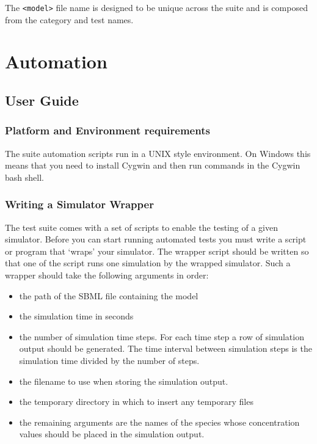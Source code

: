 \documentclass{cekarticle}
\begin{document}
The \texttt{<model>} file name is designed to be unique across the
suite and is composed from the category and test names.

\section{Automation}
\label{sec:automation}

\subsection{User Guide}
\label{sec:user-guide}

\subsubsection{Platform and Environment requirements}

The suite automation scripts run in a UNIX style environment. On
Windows this means that you need to install Cygwin and then run
commands in the Cygwin bash shell.

\subsubsection{Writing a Simulator Wrapper}

The test suite comes with a set of scripts to enable the testing
of a given simulator.  Before you can start running automated
tests you must write a script or program that `wraps' your
simulator.  The wrapper script should be written so that one of
the script runs one simulation by the wrapped simulator.  Such a
wrapper should take the following arguments in order:
\begin{itemize}

\item the path of the SBML file containing the model

\item the simulation time in seconds

\item the number of simulation time steps.  For each time step a
row of simulation output should be generated.  The time interval
between simulation steps is the simulation time divided by the
number of steps.

\item the filename to use when storing the simulation output.

\item the temporary directory in which to insert any temporary
files

\item the remaining arguments are the names of the species whose
concentration values should be placed in the simulation output.
\end{itemize}
\end{document}
